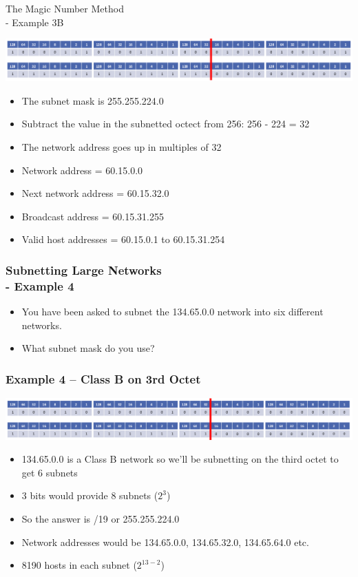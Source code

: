 \documentclass[pdflatex,compress]{beamer}
\begin{document}
\begin{frame}{The Magic Number Method\\ - Example 3B}
	\begin{center}
		\includegraphics[width=\linewidth]{img/img25}
	\end{center}
	\begin{itemize}
		\item The subnet mask is 255.255.224.0
		\item Subtract the value in the subnetted octect from 256: 256 - 224 = 32
		\item The network address goes up in multiples of 32
		\item Network address = 60.15.0.0
		\item Next network address = 60.15.32.0
		\item Broadcast address = 60.15.31.255
		\item Valid host addresses = 60.15.0.1 to 60.15.31.254
	\end{itemize}
\end{frame}

\begin{frame}
	\frametitle{Subnetting Large Networks\\ - Example 4}
	\begin{itemize}
		\item You have been asked to subnet the 134.65.0.0 network into six different networks.
		\item What subnet mask do you use?
	\end{itemize}
\end{frame}

\begin{frame}
	\frametitle{Example 4 – Class B on 3rd Octet}
	\begin{center}
		\includegraphics[width=\linewidth]{img/img26}
	\end{center}
	\begin{itemize}
		\item 134.65.0.0 is a Class B network so we’ll be subnetting on the third octet to get 6 subnets
		\item 3 bits would provide 8 subnets ($ 2^3 $)
		\item So the answer is /19 or 255.255.224.0
		\item Network addresses would be 134.65.0.0, 134.65.32.0, 134.65.64.0 etc.
		\item 8190 hosts in each subnet ($ 2^{13-2} $)
	\end{itemize}
\end{frame}
\end{document}
